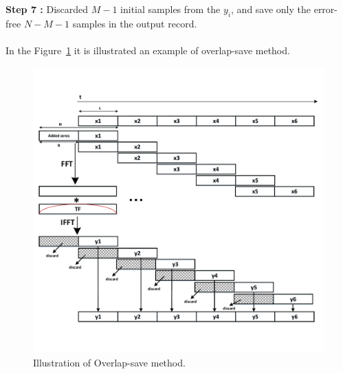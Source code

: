 \textbf{ Step 7 :} Discarded $M-1$ initial samples from the $y_i$, and save only the error-free $N-M-1$ samples in the output record.\\ \\
In the Figure~\ref{overlapSave} it is illustrated an example of overlap-save method.
\begin{figure}[h]
	\centering
	\includegraphics[width=12cm]{./algorithms/overlap_save/figures/overlap-savev2.pdf}
	\caption{Illustration of Overlap-save method.}
	\label{overlapSave}
\end{figure}



